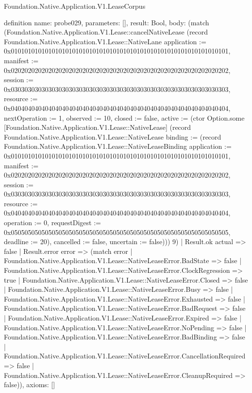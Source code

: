 \begin{lexlean}{Foundation.Native.Application.V1.LeaseCorpus}
\begin{semanticmodule}
definition{
  name: probe029,
  parameters: [],
  result: Bool,
  body: (match (Foundation.Native.Application.V1.Lease::cancelNativeLease (record Foundation.Native.Application.V1.Lease::NativeLane {application := 0x0101010101010101010101010101010101010101010101010101010101010101, manifest := 0x0202020202020202020202020202020202020202020202020202020202020202, session := 0x0303030303030303030303030303030303030303030303030303030303030303, resource := 0x0404040404040404040404040404040404040404040404040404040404040404, nextOperation := 1, observed := 10, closed := false, active := (ctor Option.some [Foundation.Native.Application.V1.Lease::NativeLease] (record Foundation.Native.Application.V1.Lease::NativeLease {binding := (record Foundation.Native.Application.V1.Lease::NativeLeaseBinding {application := 0x0101010101010101010101010101010101010101010101010101010101010101, manifest := 0x0202020202020202020202020202020202020202020202020202020202020202, session := 0x0303030303030303030303030303030303030303030303030303030303030303, resource := 0x0404040404040404040404040404040404040404040404040404040404040404, operation := 0, requestDigest := 0x0505050505050505050505050505050505050505050505050505050505050505, deadline := 20}), cancelled := false, uncertain := false}))}) 9)
    | Result.ok actual => false
    | Result.error error => (match error
      | Foundation.Native.Application.V1.Lease::NativeLeaseError.BadState => false
      | Foundation.Native.Application.V1.Lease::NativeLeaseError.ClockRegression => true
      | Foundation.Native.Application.V1.Lease::NativeLeaseError.Closed => false
      | Foundation.Native.Application.V1.Lease::NativeLeaseError.Busy => false
      | Foundation.Native.Application.V1.Lease::NativeLeaseError.Exhausted => false
      | Foundation.Native.Application.V1.Lease::NativeLeaseError.BadRequest => false
      | Foundation.Native.Application.V1.Lease::NativeLeaseError.Expired => false
      | Foundation.Native.Application.V1.Lease::NativeLeaseError.NoPending => false
      | Foundation.Native.Application.V1.Lease::NativeLeaseError.BadBinding => false
      | Foundation.Native.Application.V1.Lease::NativeLeaseError.CancellationRequired => false
      | Foundation.Native.Application.V1.Lease::NativeLeaseError.CleanupRequired => false)),
  axioms: []
}


\end{semanticmodule}
\end{lexlean}
